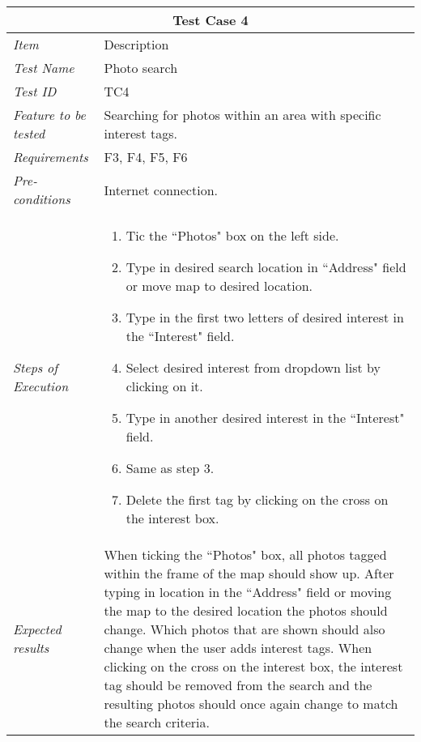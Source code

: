 \begin{minipage}{\linewidth}
\setlength{\tabcolsep}{15pt}
\centering
{}
\begin{tabular}{ |l|p{70mm}| }
	\hline
	\multicolumn{2}{|c|}{\cellcolor{gray!25} \textbf{Test Case 4}} \\
	\hline
	\it{\cellcolor{gray!25}Item} & {\cellcolor{gray!25} Description } \\
	\hline
	\it{\cellcolor{gray!25}Test Name } & Photo search \\ \hline
	\it{\cellcolor{gray!25}Test ID} & TC4 \\ \hline
	\it{\cellcolor{gray!25}Feature to be tested} & Searching for photos within an area with specific interest tags. \\ \hline
	\it{\cellcolor{gray!25}Requirements} & F3, F4, F5, F6  \\ \hline
	\it{\cellcolor{gray!25}Pre-conditions} & Internet connection. \\ \hline
	\it{\cellcolor{gray!25}Steps of Execution} & \begin{enumerate}
	                                       \item Tic the ``Photos" box on the left side.
	                                       \item Type in desired search location in ``Address" field or move map to desired location.
	                                       \item Type in the first two letters of desired interest in the ``Interest" field.
	                                       \item Select desired interest from dropdown list by clicking on it.
	                                       \item Type in another desired interest in the ``Interest" field.
	                                       \item Same as step 3.
	                                       \item Delete the first tag by clicking on the cross on the interest box.
	                                     \end{enumerate} \\ \hline
	\it{\cellcolor{gray!25}Expected results} & When ticking the ``Photos" box, all photos tagged within the frame of the map should show up. After typing in location in the ``Address" field or moving the map to the desired location the photos should change. Which photos that are shown should also change when the user adds interest tags. When clicking on the cross on the interest box, the interest tag should be removed from the search and the resulting photos should once again change to match the search criteria. \\
	\hline
\end{tabular}
\medskip
\end{minipage}
